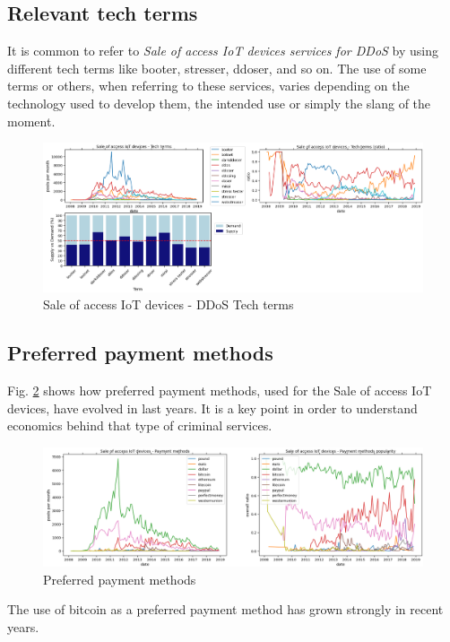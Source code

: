 \subsection{Relevant tech terms}

It is common to refer to \textit{Sale of access IoT devices services for DDoS} by using different tech terms like booter, stresser, ddoser, and so on. The use of some terms or others, when referring to these services, varies depending on the technology used to develop them, the intended use or simply the slang of the moment.

\begin{figure}[H]
	\centering
	\includegraphics[width=1.0\textwidth]{figs/terms.png}
	\caption{Sale of access IoT devices - DDoS Tech terms}
	\label{fig:terms}
\end{figure}

\subsection{Preferred payment methods}

Fig. \ref{fig:payment_methods} shows how preferred payment methods, used for the Sale of access IoT devices, have evolved in last years. It is a key point in order to understand economics behind that type of criminal services.

\begin{figure}[H]
	\centering
	\includegraphics[width=1.0\textwidth]{figs/payment_methods.png}
	\caption{Preferred payment methods}
	\label{fig:payment_methods}
\end{figure}

The use of bitcoin as a preferred payment method has grown strongly in recent years. 